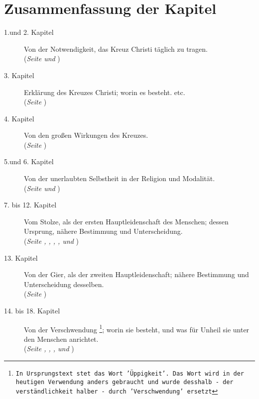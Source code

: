 \documentclass[a5paper,pagesize,9pt]{scrbook}
\begin{document}
\chapter{Zusammenfassung der Kapitel}
\begin{description}
\item[1.und 2. Kapitel] Von der Notwendigkeit, das Kreuz Christi täglich zu
tragen.
\\(\textit{Seite \pageref{kap1} und  \pageref{kap2}})
\item[3. Kapitel] Erklärung des Kreuzes Christi; worin es besteht. etc.
\\(\textit{Seite \pageref{kap3}})
\item[4. Kapitel] Von den großen Wirkungen des Kreuzes.
\\(\textit{Seite \pageref{kap4}})
\item[5.und 6. Kapitel] Von der unerlaubten Selbstheit in der Religion und
Modalität.
\\(\textit{Seite \pageref{kap5} und \pageref{kap6}})
\item[7. bis 12. Kapitel] Vom Stolze, als der ersten Hauptleidenschaft des
Menschen; dessen Ursprung, nähere Bestimmung und Unterscheidung.
\\(\textit{Seite \pageref{kap7}, \pageref{kap8}, \pageref{kap9}, \pageref{kap10}, \pageref{kap11} und \pageref{kap12}})
\item[13. Kapitel] Von der Gier, als der zweiten Hauptleidenschaft; nähere
Bestimmung und Unterscheidung desselben.
\\(\textit{Seite \pageref{kap13}})
\item[14. bis 18. Kapitel] Von der Verschwendung
\footnote{\texttt{In Ursprungstext stet
das Wort 'Üppigkeit'. Das Wort wird in der heutigen Verwendung anders
gebraucht und wurde desshalb - der verständlichkeit halber - durch
'Verschwendung' ersetzt}}; worin sie besteht, und was für Unheil sie unter den
Menschen anrichtet.
\\(\textit{Seite \pageref{kap14}, \pageref{kap15}, \pageref{kap16},
\pageref{kap17} und \pageref{kap18}})
\end{description}



















\end{document}
